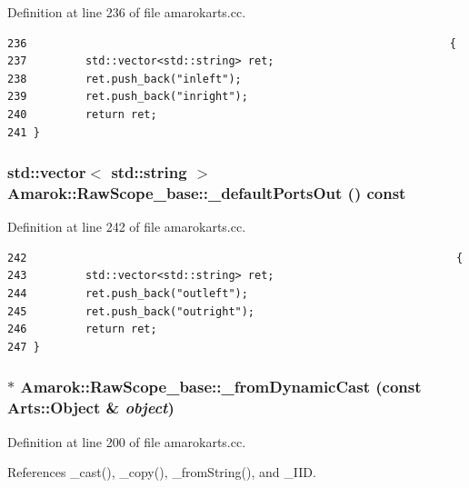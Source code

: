 Definition at line 236 of file amarokarts.cc.



\footnotesize\begin{verbatim}236                                                                 {
237         std::vector<std::string> ret;
238         ret.push_back("inleft");
239         ret.push_back("inright");
240         return ret;
241 }
\end{verbatim}\normalsize 
{}
\subsubsection{\setlength{\rightskip}{0pt plus 5cm}std::vector$<$ std::string $>$ Amarok::Raw\-Scope\_\-base::\_\-default\-Ports\-Out () const\hspace{0.3cm}{\tt  [virtual]}}\label{classAmarok_1_1RawScope__base_Amarok_1_1RawScope__stuba6}




Definition at line 242 of file amarokarts.cc.



\footnotesize\begin{verbatim}242                                                                  {
243         std::vector<std::string> ret;
244         ret.push_back("outleft");
245         ret.push_back("outright");
246         return ret;
247 }
\end{verbatim}\normalsize 
{}
\subsubsection{ $\ast$ Amarok::Raw\-Scope\_\-base::\_\-from\-Dynamic\-Cast (const Arts::Object \& {\em object})\hspace{0.3cm}{\tt  [static]}}\label{classAmarok_1_1RawScope__base_Amarok_1_1RawScope__stube3}




Definition at line 200 of file amarokarts.cc.

References \_\-cast(), \_\-copy(), \_\-from\-String(), and \_\-IID.



